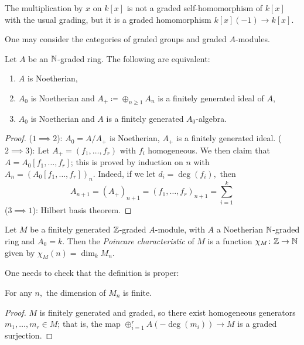 \begin{example}
  The multiplication by \(x\) on \(k[x]\) is not a graded self-homomorphism of \(k[x]\) with the usual grading, but it is a graded homomorphism \(k[x](-1) \to k[x].\)
\end{example}

One may consider the categories of graded groups and graded \(A\)-modules.

\begin{prop}
  Let \(A\) be an \(\mathbb N\)-graded ring. The following are equivalent:
  \begin{enumerate}
  \item \(A\) is Noetherian,
  \item \(A_0\) is Noetherian and \(A_+ \coloneqq \oplus_{n \geq 1} A_n\) is a finitely generated ideal of \(A\),
  \item \(A_0\) is Noetherian and \(A\) is a finitely generated \(A_0\)-algebra.
  \end{enumerate}
\end{prop}
\begin{proof}
  (\(1 \implies 2\)): \(A_0 = A / {A_+}\) is Noetherian, \(A_+\) is a finitely generated ideal.
  (\(2 \implies 3\)): Let \(A_+ = (f_1, \dotsc, f_r)\) with \(f_i\) homogeneous. We then claim that \(A = A_0[f_1, \dotsc, f_r]\); this is proved by induction on \(n\) with
  \(A_n = (A_0[f_1, \dotsc, f_r])_n.\) Indeed, if we let \(d_i = \deg(f_i),\) then
  \[A_{n+1} = (A_+)_{n+1} = (f_1, \dotsc, f_r)_{n+1} = \sum_{i=1}^k\]
  (\(3 \implies 1\)): Hilbert basis theorem.
\end{proof}

\begin{df}
  Let \(M\) be a finitely generated \(\mathbb Z\)-graded \(A\)-module, with \(A\) a Noetherian \(\mathbb N\)-graded ring and \(A_0 = k.\) Then the \emph{Poincare characteristic} of \(M\) is a function \(\chi_M \colon \mathbb Z \to \mathbb N\) given by
  \(\chi_M(n) = \dim_k M_n.\)
\end{df}

One needs to check that the definition is proper:

\begin{lemma}
  For any \(n,\) the dimension of \(M_n\) is finite.
\end{lemma}
\begin{proof}
  \(M\) is finitely generated and graded, so there exist homogeneous generators \(m_1, \dotsc, m_r \in M\); that is, the map
  \(\oplus_{i=1}^r A(-\deg(m_i)) \to M\)
  is a graded surjection.
\end{proof}

